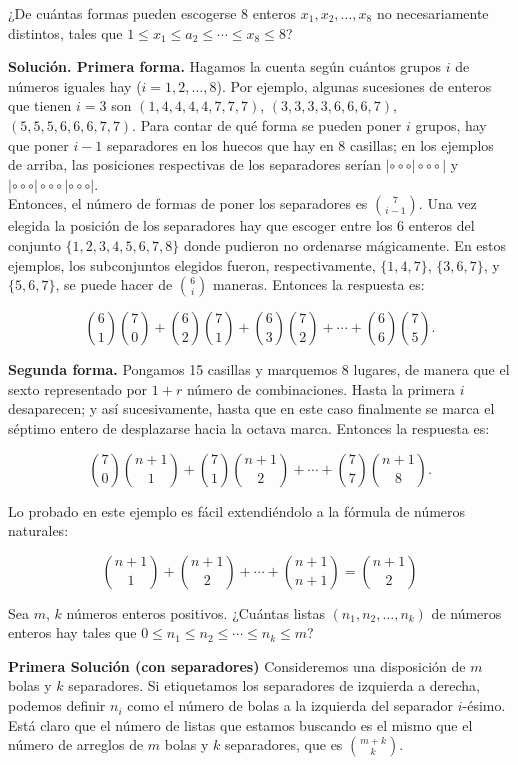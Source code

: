 \documentclass[11pt]{scrartcl}
\begin{document}
\begin{example}
¿De cuántas formas pueden escogerse 8 enteros $x_1, x_2, \dots, x_8$ no necesariamente distintos, tales que $1 \leq x_1 \leq a_2 \leq \cdots \leq x_8 \leq 8$?
\end{example}
\textbf{Solución. Primera forma.} Hagamos la cuenta según cuántos grupos $i$ de números iguales hay ($i = 1, 2, \dots, 8$). Por ejemplo, algunas sucesiones de enteros que tienen $i = 3$ son $(1, 4, 4, 4, 4, 7, 7, 7)$, $(3, 3, 3, 3, 6, 6, 6, 7)$, $(5, 5, 5, 6, 6, 6, 7, 7)$. Para contar de qué forma se pueden poner $i$ grupos, hay que poner $i - 1$ separadores en los huecos que hay en 8 casillas; en los ejemplos de arriba, las posiciones respectivas de los separadores serían $| \circ\circ\circ | \circ\circ\circ |$ y $| \circ\circ\circ | \circ\circ\circ | \circ\circ\circ |$.\\

Entonces, el número de formas de poner los separadores es $\binom{7}{i-1}$. Una vez elegida la posición de los separadores hay que escoger entre los 6 enteros del conjunto $\{1, 2, 3, 4, 5, 6, 7, 8\}$ donde pudieron no ordenarse mágicamente. En estos ejemplos, los subconjuntos elegidos fueron, respectivamente, $\{1, 4, 7\}$, $\{3, 6, 7\}$, y $\{5, 6, 7\}$, se puede hacer de $\binom{6}{i}$ maneras. Entonces la respuesta es:

\[
\binom{6}{1} \binom{7}{0} + \binom{6}{2} \binom{7}{1} + \binom{6}{3} \binom{7}{2} + \cdots + \binom{6}{6} \binom{7}{5}.
\]

\textbf{Segunda forma.} Pongamos 15 casillas y marquemos 8 lugares, de manera que el sexto representado por $1 + r$ número de combinaciones. Hasta la primera $i$ desaparecen; y así sucesivamente, hasta que en este caso finalmente se marca el séptimo entero de desplazarse hacia la octava marca. Entonces la respuesta es:

\[
\binom{7}{0} \binom{n+1}{1} + \binom{7}{1} \binom{n+1}{2} + \cdots + \binom{7}{7} \binom{n+1}{8}.
\]

Lo probado en este ejemplo es fácil extendiéndolo a la fórmula de números naturales:

\[
\binom{n+1}{1} + \binom{n+1}{2} + \cdots + \binom{n+1}{n+1} = \binom{n+1}{2}
\]

\begin{example}
Sea $m$, $k$ números enteros positivos. ¿Cuántas listas $(n_1, n_2, \dots, n_k)$ de números enteros hay tales que $0 \leq n_1 \leq n_2 \leq \cdots \leq n_k \leq m$?
\end{example}
\textbf{Primera Solución (con separadores)} Consideremos una disposición de $m$ bolas y $k$ separadores. Si etiquetamos los separadores de izquierda a derecha, podemos definir $n_i$ como el número de bolas a la izquierda del separador $i$-ésimo. Está claro que el número de listas que estamos buscando es el mismo que el número de arreglos de $m$ bolas y $k$ separadores, que es $\binom{m+k}{k}$.\\
\end{document}
